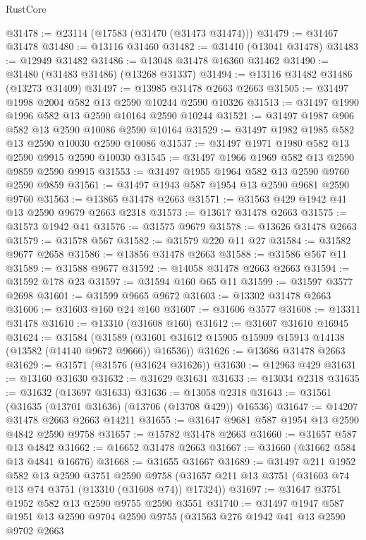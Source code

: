 \begin{lexlean}{RustCore}
\begin{coremodule}
@31478 := @23114 (@17583 (@31470 (@31473 @31474)))
@31479 := @31467 @31478
@31480 := @13116 @31460
@31482 := @31410 (@13041 @31478)
@31483 := @12949 @31482
@31486 := @13048 @31478 @16360 @31462
@31490 := @31480 (@31483 @31486) (@13268 @31337)
@31494 := @13116 @31482 @31486 (@13273 @31409)
@31497 := @13985 @31478 @2663 @2663
@31505 := @31497 @1998 @2004 @582 @13 @2590 @10244 @2590 @10326
@31513 := @31497 @1990 @1996 @582 @13 @2590 @10164 @2590 @10244
@31521 := @31497 @1987 @906 @582 @13 @2590 @10086 @2590 @10164
@31529 := @31497 @1982 @1985 @582 @13 @2590 @10030 @2590 @10086
@31537 := @31497 @1971 @1980 @582 @13 @2590 @9915 @2590 @10030
@31545 := @31497 @1966 @1969 @582 @13 @2590 @9859 @2590 @9915
@31553 := @31497 @1955 @1964 @582 @13 @2590 @9760 @2590 @9859
@31561 := @31497 @1943 @587 @1954 @13 @2590 @9681 @2590 @9760
@31563 := @13865 @31478 @2663
@31571 := @31563 @429 @1942 @41 @13 @2590 @9679 @2663 @2318
@31573 := @13617 @31478 @2663
@31575 := @31573 @1942 @41
@31576 := @31575 @9679
@31578 := @13626 @31478 @2663
@31579 := @31578 @567
@31582 := @31579 @220 @11 @27
@31584 := @31582 @9677 @2658
@31586 := @13856 @31478 @2663
@31588 := @31586 @567 @11
@31589 := @31588 @9677
@31592 := @14058 @31478 @2663 @2663
@31594 := @31592 @178 @23
@31597 := @31594 @160 @65 @11
@31599 := @31597 @3577 @2698
@31601 := @31599 @9665 @9672
@31603 := @13302 @31478 @2663
@31606 := @31603 @160 @24 @160
@31607 := @31606 @3577
@31608 := @13311 @31478
@31610 := @13310 (@31608 @160)
@31612 := @31607 @31610 @16945
@31624 := @31584
    (@31589 (@31601 @31612 @15905 @15909 @15913 @14138 (@13582 (@14140 @9672 @9666)) @16536))
@31626 := @13686 @31478 @2663
@31629 := @31571 (@31576 (@31624 @31626))
@31630 := @12963 @429
@31631 := @13160 @31630
@31632 := @31629 @31631
@31633 := @13034 @2318
@31635 := @31632 (@13697 @31633)
@31636 := @13058 @2318
@31643 := @31561 (@31635 (@13701 @31636) (@13706 (@13708 @429)) @16536)
@31647 := @14207 @31478 @2663 @2663 @14211
@31655 := @31647 @9681 @587 @1954 @13 @2590 @4842 @2590 @9758
@31657 := @15782 @31478 @2663
@31660 := @31657 @587 @13 @4842
@31662 := @16652 @31478 @2663
@31667 := @31660 (@31662 @584 @13 @4841 @16676)
@31668 := @31655 @31667
@31689 := @31497
    @211
    @1952
    @582
    @13
    @2590
    @3751
    @2590
    @9758
    (@31657 @211 @13 @3751 (@31603 @74 @13 @74 @3751 (@13310 (@31608 @74)) @17324))
@31697 := @31647 @3751 @1952 @582 @13 @2590 @9755 @2590 @3551
@31740 := @31497
    @1947
    @587
    @1951
    @13
    @2590
    @9704
    @2590
    @9755
    (@31563
      @276
      @1942
      @41
      @13
      @2590
      @9702
      @2663

\end{coremodule}
\end{lexlean}
